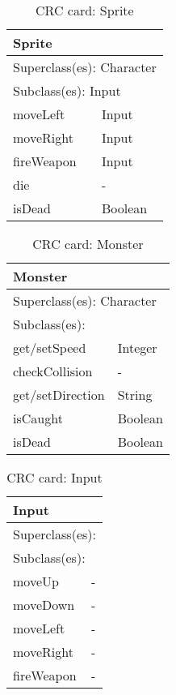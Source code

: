 \begin{table}[]
\centering
\label{crc_sprite}
\begin{tabular}{|l|l|}
\hline
\multicolumn{2}{|l|}{Sprite} \\ \hline
\multicolumn{2}{|l|}{Superclass(es): Character} \\ \hline
\multicolumn{2}{|l|}{Subclass(es): Input} \\ \hline
moveLeft            & Input \\ \hline
moveRight           & Input \\ \hline
fireWeapon          & Input \\ \hline
die                 & - \\ \hline
isDead              & Boolean \\ \hline
\end{tabular}
\caption{CRC card: Sprite}
\end{table}

\begin{table}[]
\centering
\label{crc_monster}
\begin{tabular}{|l|l|}
\hline
\multicolumn{2}{|l|}{Monster} \\ \hline
\multicolumn{2}{|l|}{Superclass(es): Character} \\ \hline
\multicolumn{2}{|l|}{Subclass(es):} \\ \hline
get/setSpeed            & Integer \\ \hline
checkCollision          & -\\ \hline
get/setDirection        & String\\ \hline
isCaught                & Boolean \\ \hline
isDead                  & Boolean \\ \hline
\end{tabular}
\caption{CRC card: Monster}
\end{table}

\begin{table}[]
\centering
\label{crc_input}
\begin{tabular}{|l|l|}
\hline
\multicolumn{2}{|l|}{Input} \\ \hline
\multicolumn{2}{|l|}{Superclass(es):} \\ \hline
\multicolumn{2}{|l|}{Subclass(es):} \\ \hline
moveUp          & -\\ \hline
moveDown        & - \\ \hline
moveLeft        & -\\ \hline
moveRight       & -\\ \hline
fireWeapon      & - \\ \hline
\end{tabular}
\caption{CRC card: Input}
\end{table}

